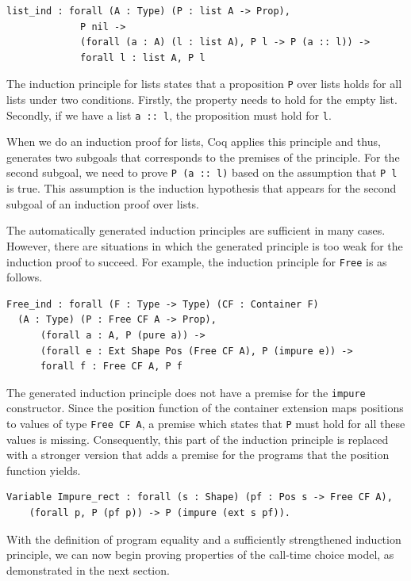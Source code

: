 \documentclass[a4paper, 11pt, fleqn, twoside, abstract=on]{scrreprt}
\newcommand{\cinl}[1]{\texttt{#1}}
\begin{document}
\begin{verbatim}
list_ind : forall (A : Type) (P : list A -> Prop),
             P nil ->
             (forall (a : A) (l : list A), P l -> P (a :: l)) ->
             forall l : list A, P l
\end{verbatim}
\noindent
The induction principle for lists states that a proposition \cinl{P} over lists holds for all lists under two conditions.
Firstly, the property needs to hold for the empty list.
Secondly, if we have a list \cinl{a :: l}, the proposition must hold for \cinl{l}.

When we do an induction proof for lists, Coq applies this principle and thus, generates two subgoals that corresponds to the premises of the principle.
For the second subgoal, we need to prove \cinl{P (a :: l)} based on the assumption that \cinl{P l} is true.
This assumption is the induction hypothesis that appears for the second subgoal of an induction proof over lists.

The automatically generated induction principles are sufficient in many cases.
However, there are situations in which the generated principle is too weak for the induction proof to succeed.
For example, the induction principle for \cinl{Free} is as follows.

\begin{verbatim}
Free_ind : forall (F : Type -> Type) (CF : Container F) 
  (A : Type) (P : Free CF A -> Prop),
      (forall a : A, P (pure a)) -> 
      (forall e : Ext Shape Pos (Free CF A), P (impure e)) -> 
      forall f : Free CF A, P f
\end{verbatim}

The generated induction principle does not have a premise for the \cinl{impure} constructor.
Since the position function of the container extension maps positions to values of type \cinl{Free CF A}, a premise which states that \cinl{P} must hold for all these values is missing.
Consequently, this part of the induction principle is replaced with a stronger version that adds a premise for the programs that the position function yields.

\begin{verbatim}
Variable Impure_rect : forall (s : Shape) (pf : Pos s -> Free CF A),
    (forall p, P (pf p)) -> P (impure (ext s pf)).
\end{verbatim}

With the definition of program equality and a sufficiently strengthened induction principle, we can now begin proving properties of the call-time choice model, as demonstrated in the next section.
\end{document}
